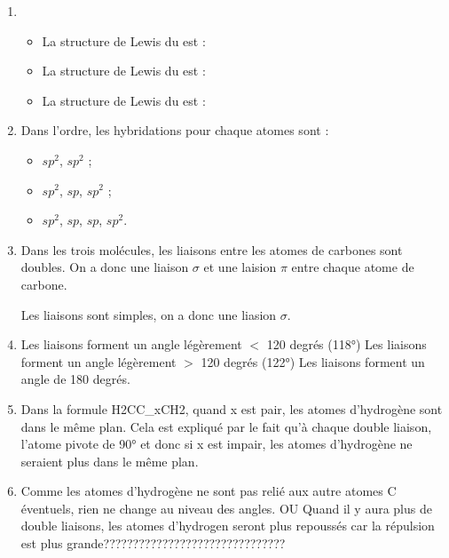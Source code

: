 \documentclass{article}
\newcommand\chemfigc[1]{
\vspace{0.5cm}
\begin{center}\chemfig{#1}\end{center}
\vspace{0.5cm}}
\begin{document}
\begin{enumerate}\renewcommand{\theenumi}{\alph{enumi}}
	\item 
				\begin{itemize}
					\item La structure de Lewis du  est :
		
								\chemfigc{C(-[:135]H)(-[:-135]H)=C(-[:45]H)(-[:-45]H)}
					\item La structure de Lewis du  est :
					
								\chemfigc{C(-[:135]H)(-[:-135]H)=C=C(-[:45]H)(-[:-45]H)}
					\item La structure de Lewis du  est :
					
								\chemfigc{C(-[:135]H)(-[:-135]H)=C=C=C(-[:45]H)(-[:-45]H)}
				\end{itemize}
				
	\item	Dans l'ordre, les hybridations pour chaque atomes  sont :
	
				\begin{itemize}
					\item $sp^2$, $sp^2$ ;
					\item $sp^2$, $sp$, $sp^2$ ;
					\item $sp^2$, $sp$, $sp$, $sp^2$.
				\end{itemize}
				
	\item	Dans les trois molécules, les liaisons entre les atomes de carbones sont doubles. On a donc
				une liaison $\sigma$ et une laision $\pi$ entre chaque atome de carbone.
				
				Les liaisons  sont simples, on a donc une liasion $\sigma$.
	\item Les liaisons  forment un angle légèrement $<$ 120 degrés (118°)
				Les liaisons  forment un angle légèrement $>$ 120 degrés (122°)
				Les liaisons  forment un angle de 180 degrés.
	\item	Dans la formule H2CC_xCH2, quand x est pair, les atomes d'hydrogène sont dans le même plan.  
	Cela est expliqué par le fait qu'à chaque double liaison, l'atome pivote de 90° et donc si x est impair, les atomes d'hydrogène ne seraient plus dans le même plan.
	\item Comme les atomes d'hydrogène ne sont pas relié aux autre atomes C éventuels, rien ne change au niveau des angles.
	OU  Quand il y aura plus de double liaisons, les atomes d'hydrogen seront plus repoussés car la répulsion est plus grande???????????????????????????????
\end{enumerate}
\end{document}
